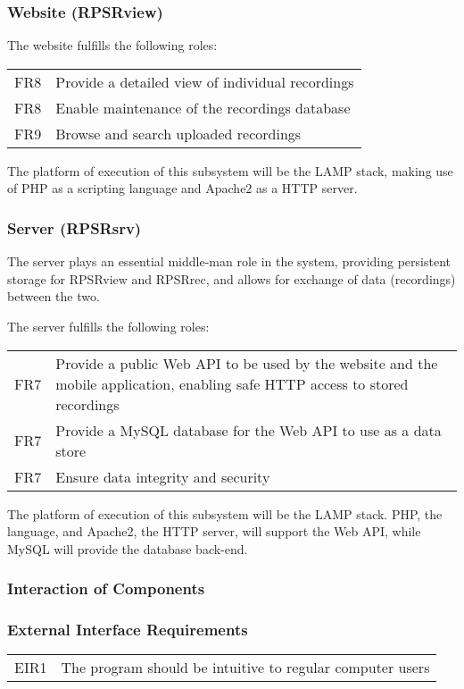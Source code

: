 \subsubsection{Website (RPSRview)}
    The website fulfills the following roles:\\    
    	\begin{tabular}{r | p{15cm}}
        	FR8 & Provide a detailed view of individual recordings \\
        	FR8 & Enable maintenance of the recordings database \\
    		FR9 & Browse and search uploaded recordings \\
        \end{tabular}
    The platform of execution of this subsystem will be the LAMP stack, making use of PHP as a scripting language and Apache2 as a HTTP server.
        
\subsubsection{Server (RPSRsrv)}
    The server plays an essential middle-man role in the system, providing persistent storage for RPSRview and RPSRrec,
    and allows for exchange of data (recordings) between the two. 

    The server fulfills the following roles:\\
    \begin{tabular}{r | p{15cm}}
        FR7 & Provide a public Web API to be used by the website and the mobile application, enabling safe HTTP access to stored recordings \\
        FR7 & Provide a MySQL database for the Web API to use as a data store \\
        FR7 & Ensure data integrity and security \\
	\end{tabular}
    The platform of execution of this subsystem will be the LAMP stack. PHP, the language, and Apache2, the HTTP server, will support the Web API, while MySQL will provide the database back-end.

\subsubsection{Interaction of Components}
    

\subsubsection{External Interface Requirements}
	\begin{tabular}{r | p{15cm}}
		EIR1 & The program should be intuitive to regular computer users \\
	\end{tabular}

